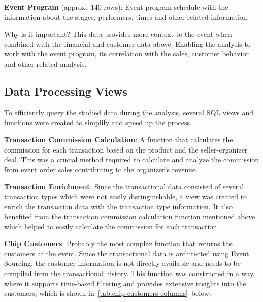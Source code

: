 \textbf{Event Program} (approx.\ 140 rows): Event program schedule with the information about the stages, performers, times and other related information.

\begin{blue-box}{Why is it important?}
	This data provides more context to the event when combined with the financial and customer data above.
	Enabling the analysis to work with the event program, its correlation with the sales, customer behavior and other related analysis.
\end{blue-box}

\subsection{Data Processing Views}
\label{subsec:data-methodology-structure-views}
To efficiently query the studied data during the analysis, several SQL views and functions were created to simplify and speed up the process.

\textbf{Transaction Commission Calculation}: A function that calculates the commission for each transaction based on the product and the seller-organizer deal.
This was a crucial method required to calculate and analyze the commission from event order sales contributing to the organizer's revenue.

\textbf{Transaction Enrichment}: Since the transactional data consisted of several transaction types which were not easily distinguishable, a view was created to enrich the transaction data with the transaction type information.
It also benefited from the transaction commission calculation function mentioned above which helped to easily calculate the commission for each transaction.

\textbf{Chip Customers}: Probably the most complex function that returns the customers at the event.
Since the transactional data is architected using Event Sourcing, the customer information is not directly available and needs to be compiled from the transactional history.
This function was constructed in a way, where it supports time-based filtering and provides extensive insights into the customers, which is shown in~\autoref{tab:chip-customers-columns}~below:

